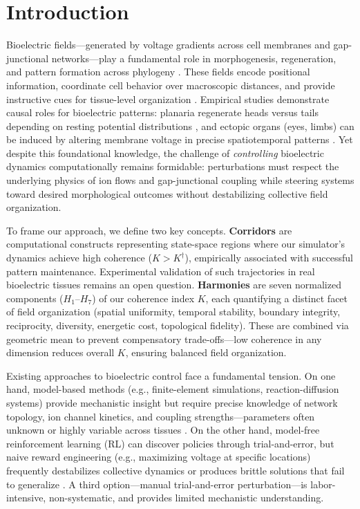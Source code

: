 \documentclass[10pt,letterpaper]{article}
\begin{document}
\linenumbers

\section*{Introduction}

Bioelectric fields—generated by voltage gradients across cell membranes and gap-junctional networks—play a fundamental role in morphogenesis, regeneration, and pattern formation across phylogeny \cite{levin2021bioelectric,levin2014molecular,mclaughlin2007bioelectric}. These fields encode positional information, coordinate cell behavior over macroscopic distances, and provide instructive cues for tissue-level organization \cite{adams2013measuring,adams2012voltage}. Empirical studies demonstrate causal roles for bioelectric patterns: planaria regenerate heads versus tails depending on resting potential distributions \cite{levin2012molecular}, and ectopic organs (eyes, limbs) can be induced by altering membrane voltage in precise spatiotemporal patterns \cite{pai2012transmembrane}. Yet despite this foundational knowledge, the challenge of \emph{controlling} bioelectric dynamics computationally remains formidable: perturbations must respect the underlying physics of ion flows and gap-junctional coupling \cite{cervera2018bioelectrical} while steering systems toward desired morphological outcomes without destabilizing collective field organization.

To frame our approach, we define two key concepts. \textbf{Corridors} are computational constructs representing state-space regions where our simulator's dynamics achieve high coherence ($K > K^\dagger$), empirically associated with successful pattern maintenance. Experimental validation of such trajectories in real bioelectric tissues remains an open question. \textbf{Harmonies} are seven normalized components ($H_1$–$H_7$) of our coherence index $K$, each quantifying a distinct facet of field organization (spatial uniformity, temporal stability, boundary integrity, reciprocity, diversity, energetic cost, topological fidelity). These are combined via geometric mean to prevent compensatory trade-offs—low coherence in any dimension reduces overall $K$, ensuring balanced field organization.

Existing approaches to bioelectric control face a fundamental tension. On one hand, model-based methods (e.g., finite-element simulations, reaction-diffusion systems) provide mechanistic insight but require precise knowledge of network topology, ion channel kinetics, and coupling strengths—parameters often unknown or highly variable across tissues \cite{cervera2018bioelectrical}. On the other hand, model-free reinforcement learning (RL) can discover policies through trial-and-error, but naive reward engineering (e.g., maximizing voltage at specific locations) frequently destabilizes collective dynamics or produces brittle solutions that fail to generalize \cite{klyubin2005empowerment}. A third option—manual trial-and-error perturbation—is labor-intensive, non-systematic, and provides limited mechanistic understanding.
\end{document}
